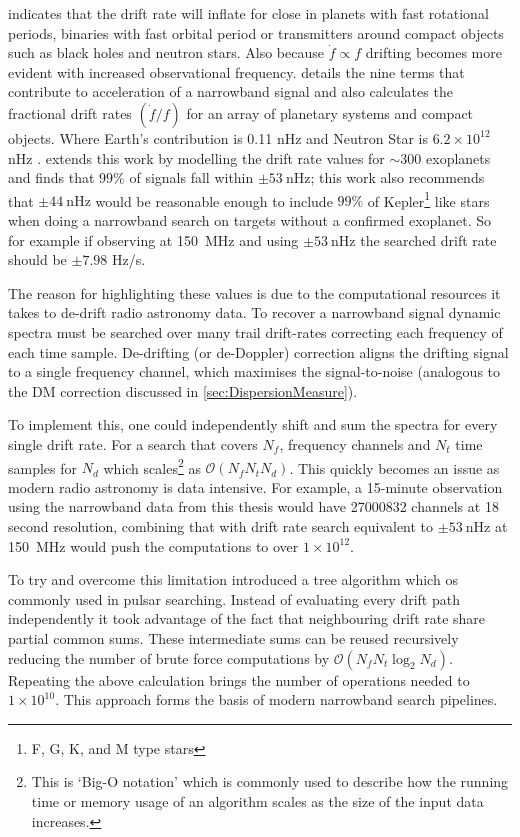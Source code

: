  indicates that the drift rate will inflate for close in planets with fast rotational periods, binaries with fast orbital period or transmitters around compact objects such as black holes and neutron stars. Also because $\dot f \propto f$ drifting becomes more evident with increased observational frequency. \cite{2019ApJSofiaMaxDriftRate} details the nine terms that contribute to acceleration of a narrowband signal and also calculates the fractional drift rates $(\dot f/f)$ for an array of planetary systems and compact objects.  Where Earth's contribution is 0.11 nHz and Neutron Star is $6.2 \times 10^{12}$ nHz \citep[see table 2,][]{2019ApJSofiaMaxDriftRate}. \cite{li_developing_2023} extends this work by modelling the drift rate values for $\sim 300$ exoplanets and finds that $99\%$ of signals fall within $\pm53~\text{nHz}$; this work also recommends that $\pm44~\text{nHz}$ would be reasonable enough to include $99\%$ of Kepler\footnote{F, G, K, and M type stars} like stars when doing a narrowband search on targets without a confirmed exoplanet. So for example if observing at 150~MHz and using $\pm 53 ~\text{nHz}$ the searched drift rate should be $\pm 7.98$ Hz/s. 

The reason for highlighting these values is due to the computational resources it takes to de-drift radio astronomy data. To recover a narrowband signal dynamic spectra must be searched over many trail drift-rates correcting each frequency of each time sample. De-drifting (or de-Doppler) correction aligns the drifting signal to a single frequency channel, which maximises the signal-to-noise (analogous to the DM correction discussed in \cref{sec:DispersionMeasure}). 

To implement this, one could independently shift and sum the spectra for every single drift rate. For a search that covers $N_f$, frequency channels and $N_t$ time samples for $N_d$ which scales\footnote{This is `Big-O notation' which is commonly used to describe how the running time or memory usage of an algorithm scales as the size of the input data increases. } as $\mathcal{O}(N_f N_tN_d)$. This quickly becomes an issue as modern radio astronomy is data intensive. For example, a 15-minute observation using the narrowband data from this thesis would have 27000832 channels at 18 second resolution, combining that with drift rate search equivalent to $\pm53~\text{nHz}$ at 150~MHz would push the computations to over $1\times 10^{12}$.

To try and overcome this limitation \cite{1974A&AS...15..367T} introduced a tree algorithm which os commonly used in pulsar searching. Instead of evaluating every drift path independently it took advantage of the fact that neighbouring drift rate share partial common sums. These intermediate sums can be reused recursively reducing the number of brute force computations by $\mathcal{O}(N_fN_t\log_2N_d)$. Repeating the above calculation brings the number of operations needed to $1\times10^{10}$. This approach forms the basis of modern narrowband search pipelines. 

